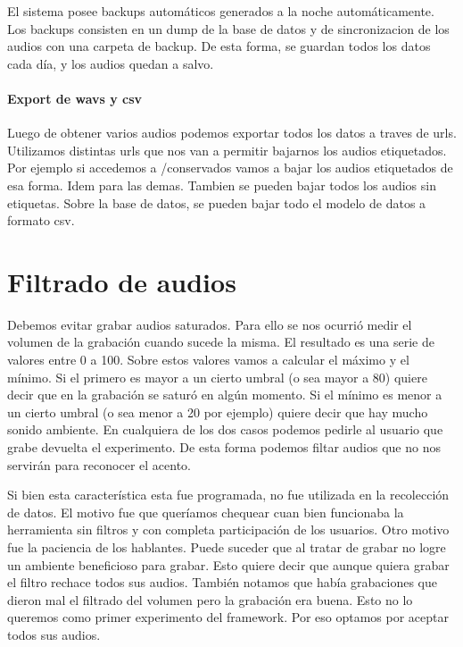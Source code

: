 \documentclass[11pt,a4paper,twoside]{tesis}
\begin{document}
El sistema posee backups automáticos generados a la noche automáticamente. Los backups consisten en un dump de la base de datos y de sincronizacion de los audios con una carpeta de backup. De esta forma, se guardan todos los datos cada día, y los audios quedan a salvo.

\paragraph{Export de wavs y csv}

Luego de obtener varios audios podemos exportar todos los datos a traves de urls. Utilizamos distintas urls que nos van a permitir bajarnos los audios etiquetados. Por ejemplo si accedemos a /conservados vamos a bajar los audios etiquetados de esa forma. Idem para las demas. Tambien se pueden bajar todos los audios sin etiquetas. Sobre la base de datos, se pueden bajar todo el modelo de datos a formato csv.

\section{Filtrado de audios}

Debemos evitar grabar audios saturados. Para ello se nos ocurrió medir el volumen de la grabación cuando sucede la misma. El resultado es una serie de valores entre 0 a 100. Sobre estos valores vamos a calcular el máximo y el mínimo. Si el primero es mayor a un cierto umbral (o sea mayor a 80) quiere decir que en la grabación se saturó en algún momento. Si el mínimo es menor a un cierto umbral (o sea menor a 20 por ejemplo) quiere decir que hay mucho sonido ambiente. En cualquiera de los dos casos podemos pedirle al usuario que grabe devuelta el experimento. De esta forma podemos filtar audios que no nos servirán para reconocer el acento.

Si bien esta característica esta fue programada, no fue utilizada en la recolección de datos. El motivo fue que queríamos chequear cuan bien funcionaba la herramienta sin filtros y con completa participación de los usuarios. Otro motivo fue la paciencia de los hablantes. Puede suceder que al tratar de grabar no logre un ambiente beneficioso para grabar. Esto quiere decir que aunque quiera grabar el filtro rechace todos sus audios. También notamos que había grabaciones que dieron mal el filtrado del volumen pero la grabación era buena. Esto no lo queremos como primer experimento del framework. Por eso optamos por aceptar todos sus audios.
\end{document}

